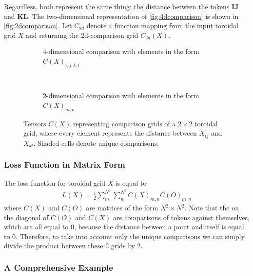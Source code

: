 Regardless, both represent the same thing: the distance between the tokens $\bm{IJ}$ and $\bm{KL}$. The two-dimensional representation of \autoref{fig:4dcomparison} is shown in \autoref{fig:2dcomparison}. Let $C_{2d}$ denote a function mapping from the input toroidal grid $X$ and returning the 2d-comparison grid $C_{2d}(X)$.
\begin{figure}[htpb]
    \centering
    \begin{subfigure}[t]{0.5\textwidth}
    \begin{center}
    \end{center}
    \caption{4-dimensional comparison with elements in the form $C(X)_{i,j,k,l}$}
    \label{fig:4dcomparison}
    \end{subfigure}%
    ~
    \begin{subfigure}[t]{0.5\textwidth}
    \begin{center}
    \end{center}
    \caption{2-dimensional comparison with elements in the form $C(X)_{m,n}$}
    \label{fig:2dcomparison}
    \end{subfigure}

    \caption{Tensors $C(X)$ representing comparison grids of a $2\times 2$ toroidal grid, where every element represents the distance between $X_{ij}$ and $X_{kl}$. Shaded cells denote unique comparisons.}%
    \label{fig:comparisonGrids}
\end{figure}

\subsubsection{Loss Function in Matrix Form}%
\label{ssub:loss_function_as_matrix_multiplications}
The loss function for toroidal grid $X$ is equal to
\begin{align*}
    L(X)=\frac{1}{2}\sum_m^{N^2}\sum_n^{N^2}C(X)_{m,n}C(O)_{m,n}
\end{align*}
where $C(X)$ and $C(O)$ are matrices of the form $N^2\times N^2$. Note that the on the diagonal of $C(O)$ and $C(X)$ are comparisons of tokens against themselves, which are all equal to $0$, because the distance between a point and itself is equal to $0$. Therefore, to take into account only the unique comparisons we can simply divide the product between these 2 grids by 2.

\subsubsection{A Comprehensive Example}%
\label{ssub:a_comprehensive_example}


